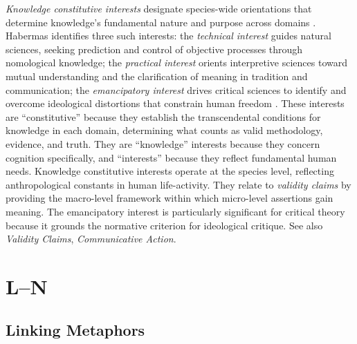 \documentclass{book}
\begin{document}
\textit{Knowledge constitutive interests} designate species-wide orientations that determine knowledge's fundamental nature and purpose across domains \parencite{Habermas:1971aa, Carspecken1995aa}. Habermas identifies three such interests: the \textit{technical interest} guides natural sciences, seeking prediction and control of objective processes through nomological knowledge; the \textit{practical interest} orients interpretive sciences toward mutual understanding and the clarification of meaning in tradition and communication; the \textit{emancipatory interest} drives critical sciences to identify and overcome ideological distortions that constrain human freedom \parencite{Habermas:1971aa}. These interests are ``constitutive'' because they establish the transcendental conditions for knowledge in each domain, determining what counts as valid methodology, evidence, and truth. They are ``knowledge'' interests because they concern cognition specifically, and ``interests'' because they reflect fundamental human needs. Knowledge constitutive interests operate at the species level, reflecting anthropological constants in human life-activity. They relate to \textit{validity claims} by providing the macro-level framework within which micro-level assertions gain meaning. The emancipatory interest is particularly significant for critical theory because it grounds the normative criterion for ideological critique. See also \textit{Validity Claims}, \textit{Communicative Action}.

\chapter{L--N}

\section{Linking Metaphors}
\end{document}
